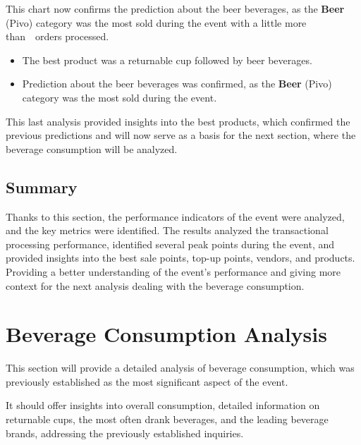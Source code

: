 This chart now confirms the prediction about the beer beverages, as the \textbf{Beer} (Pivo) category was the most sold during the event with a little more than~~orders processed.

\begin{keytakeaways}
	\begin{itemize}
		\item The best product was a returnable cup followed by beer beverages.
		\item Prediction about the beer beverages was confirmed, as the \textbf{Beer} (Pivo) category was the most sold during the event.
	\end{itemize}
\end{keytakeaways}

This last analysis provided insights into the best products, which confirmed the previous predictions and will now serve as a basis for the next section, where the beverage consumption will be analyzed.


\subsection{Summary}
\label{subsec:analysis-performance-indicators-summary}

Thanks to this section, the performance indicators of the event were analyzed, and the key metrics were identified.
The results analyzed the transactional processing performance, identified several peak points during the event, and provided insights into the best sale points, top-up points, vendors, and products.
Providing a better understanding of the event's performance and giving more context for the next analysis dealing with the beverage consumption.



\section{Beverage Consumption Analysis}
\label{sec:analysis-beverage-consumption}

This section will provide a detailed analysis of beverage consumption, which was previously established as the most significant aspect of the event.

It should offer insights into overall consumption, detailed information on returnable cups, the most often drank beverages, and the leading beverage brands, addressing the previously established inquiries.

